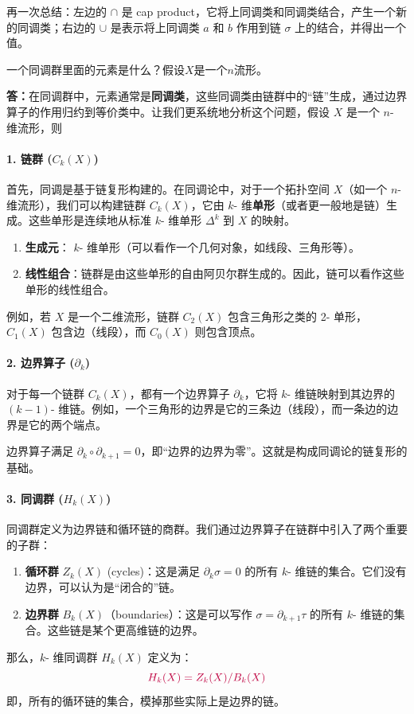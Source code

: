 \documentclass[lang=cn,zihao=5,twoside,fontset=none]{textbook}
\begin{document}
再一次总结：左边的 \( \cap \) 是 cap product，它将上同调类和同调类结合，产生一个新的同调类；右边的 \( \cup \) 是表示将上同调类 \( a \) 和 \( b \) 作用到链 \( \sigma \) 上的结合，并得出一个值。
\begin{remark}
	一个同调群里面的元素是什么？假设$X$是一个$n$流形。

\textbf{答：}在同调群中，元素通常是\textbf{同调类}，这些同调类由链群中的“链”生成，通过边界算子的作用归约到等价类中。让我们更系统地分析这个问题，假设 $X$ 是一个 $n$- 维流形，则
\paragraph*{1. 链群 ($C_k(X)$)}
首先，同调是基于链复形构建的。在同调论中，对于一个拓扑空间 $X$（如一个 $n$- 维流形），我们可以构建链群 $C_k(X)$，它由 $k$- 维\textbf{单形}（或者更一般地是链）生成。这些单形是连续地从标准 $k$- 维单形 $\Delta^k$ 到 $X$ 的映射。
\begin{enumerate}
	\item \textbf{生成元}： $k$- 维单形（可以看作一个几何对象，如线段、三角形等）。
	\item\textbf{线性组合}：链群是由这些单形的自由阿贝尔群生成的。因此，链可以看作这些单形的线性组合。
\end{enumerate}
例如，若 $X$ 是一个二维流形，链群 $C_2(X)$ 包含三角形之类的 2- 单形，$C_1(X)$ 包含边（线段），而 $C_0(X)$ 则包含顶点。

\paragraph*{2. 边界算子 ($\partial_k$)}
对于每一个链群 $C_k(X)$，都有一个边界算子 $\partial_k$，它将 $k$- 维链映射到其边界的 $(k-1)$- 维链。例如，一个三角形的边界是它的三条边（线段），而一条边的边界是它的两个端点。

边界算子满足 $\partial_k \circ \partial_{k+1} = 0$，即“边界的边界为零”。这就是构成同调论的链复形的基础。

\paragraph*{3. 同调群 ($H_k(X)$)}
同调群定义为边界链和循环链的商群。我们通过边界算子在链群中引入了两个重要的子群：
\begin{enumerate}
	\item \textbf{循环群} $Z_k(X)$ (cycles)：这是满足 $\partial_k \sigma = 0$ 的所有 $k$- 维链的集合。它们没有边界，可以认为是“闭合的”链。
	\item\textbf{边界群} $B_k(X)$（boundaries）：这是可以写作 $\sigma = \partial_{k+1} \tau$ 的所有 $k$- 维链的集合。这些链是某个更高维链的边界。
\end{enumerate}
那么，$k$- 维同调群 $H_k(X)$ 定义为：
$$
\color{purple}
H_k(X) = Z_k(X) / B_k(X)
$$
即，所有的循环链的集合，模掉那些实际上是边界的链。


\end{remark}
\end{document}
